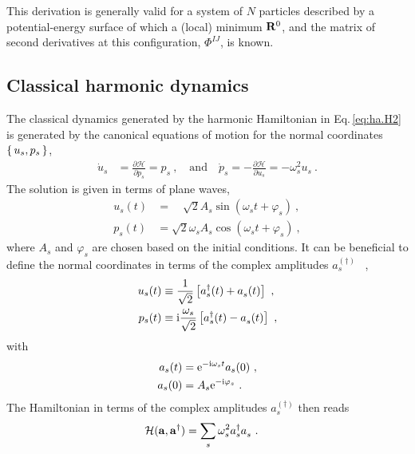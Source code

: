 This derivation is generally valid for a system of $N$ particles described by a potential-energy surface of which a (local) minimum ${\bf R}^0$, and the matrix of second derivatives at this configuration, $\Phi^{IJ}$, is known.

\subsection{Classical harmonic dynamics}

The classical dynamics generated by the harmonic Hamiltonian in Eq.\,\eqref{eq:ha.H2} is generated by the canonical equations of motion for the normal coordinates $\set{ u_s, p_s}$,
\begin{align}
	\dot{u}_s
		& = \frac{\partial \mathcal H}{\partial p_s}
			= p_s~,\quad\text{and}\quad
	\dot{p}_s
		 = - \frac{\partial \mathcal H}{\partial u_s}
			= - \omega^2_s u_s~.
\end{align}
The solution is given in terms of plane waves,
\begin{subequations}
\begin{align}
	u_s (t) 
		&= \phantom{\omega_s} \sqrt 2 A_s \sin (\omega_s t + \varphi_s)~,\\
	p_s (t) 
		&= \sqrt 2 \omega_s A_s \cos (\omega_s t + \varphi_s)~,
\end{align}
\end{subequations}
where $A_s$ and $\varphi_s$ are chosen based on the initial conditions. It can be beneficial to define the normal coordinates in terms of the complex amplitudes $a^{(\dagger)}_s$ ~,
\begin{subequations}
\begin{align}
	u_s (t) 
		&\equiv \frac{1}{\sqrt{2}} \left[ \D a_s (t) + \fD a_s (t) \right]~, \\
	p_s (t) 
		&\equiv \im \frac{\omega_s}{\sqrt{2}} \left[ \D a_s (t) - \fD a_s (t) \right]~,
\end{align}
\end{subequations}
with
\begin{subequations}
\begin{align}
	a_s (t) 
		& = {\rm e}^{- {\rm i} \omega_s t} a_s (0)~, \\
	a_s (0)
		& = A_s {\rm e}^{- {\rm i} \varphi_s}~.
\end{align}
\label{eq:a_s(t)}
\end{subequations}
The Hamiltonian in terms of the complex amplitudes $a^{(\dagger)}_s$ then reads
\begin{align}
	\mathcal{H}(\b a, \D{\b a})
		&= \sum_s \omega^2_s \D a_s\fD  a_s~.
\end{align}

